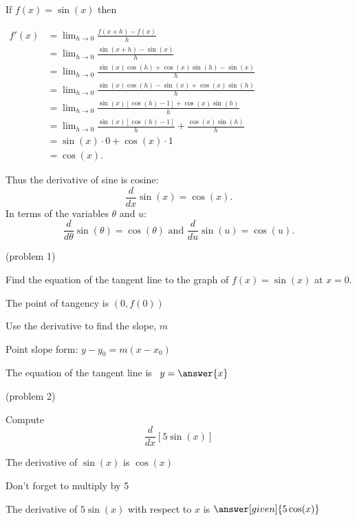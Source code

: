\documentclass{ximera}
\begin{document}
\begin{explanation} %
If $f(x) = \sin(x)$ then
\begin{center}
$\begin{aligned}
f'(x) &= \lim_{h \to 0} \frac{f(x+h)-f(x)}{h} \\[5pt]
&= \lim_{h \to 0} \frac{\sin(x+h) - \sin(x)}{h}\\[5pt]
&=  \lim_{h \to 0} \frac{\sin(x)\cos(h) + \cos(x)\sin(h) - \sin(x)}{h}\\[5pt]
&=  \lim_{h \to 0} \frac{\sin(x)\cos(h)  - \sin(x) + \cos(x)\sin(h)}{h}\\[5pt]
&=  \lim_{h \to 0} \frac{\sin(x)[\cos(h) -1] + \cos(x)\sin(h)}{h}\\[5pt]
&=  \lim_{h \to 0} \frac{\sin(x)[\cos(h) -1]}{h} + \frac{\cos(x)\sin(h)}{h}\\[5pt]
&=  \sin(x) \cdot 0 + \cos(x) \cdot 1 \\[5pt]
&= \cos(x).
\end{aligned}$
\end{center}
Thus the derivative of sine is cosine:
\[
\frac{d}{dx}\sin(x) = \cos(x).
\]
In terms of the variables $\theta$ and $u$:
\[
\frac{d}{d\theta}\sin(\theta) = \cos(\theta) \text{  and  } \frac{d}{du}\sin(u) = \cos(u).
\]
\end{explanation}



\begin{problem}(problem 1)

Find the equation of the tangent line to the graph of $f(x) = \sin(x)$ at $x=0.$

\begin{hint}
The point of tangency is $(0, f(0))$
\end{hint}
\begin{hint}
Use the derivative to find the slope, $m$
\end{hint}
\begin{hint}
Point slope form: $y-y_0 = m(x-x_0)$
\end{hint}

The equation of the tangent line is \ $y = \answer{x}$

\end{problem}





\begin{problem}(problem 2)
  
Compute 
\[
\frac{d}{dx} \left[5\sin(x)\right]
\]
  
\begin{hint}
The derivative of $\sin(x)$ is $\cos(x)$
\end{hint}
\begin{hint}
Don't forget to multiply by 5
\end{hint}
		
The derivative of $5\sin(x)$ with respect to $x$ is
$\answer[given]{5\cos(x)}$

\end{problem}
\end{document}
